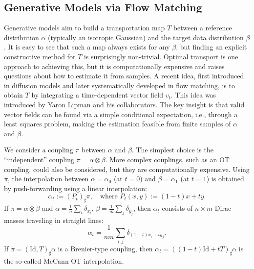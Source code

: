 \subsection{Generative Models via Flow Matching}

Generative models aim to build a transportation map $T$ between a reference distribution $\alpha$ (typically an isotropic Gaussian) and the target data distribution $\beta$. It is easy to see that such a map always exists for any $\beta$, but finding an explicit constructive method for $T$ is surprisingly non-trivial. 
%
Optimal transport is one approach to achieving this, but it is computationally expensive and raises questions about how to estimate it from samples. A recent idea, first introduced in diffusion models and later systematically developed in flow matching, is to obtain $T$ by integrating a time-dependent vector field $v_t$. This idea was introduced by Yaron Lipman and his collaborators. The key insight is that valid vector fields can be found via a simple conditional expectation, i.e., through a least squares problem, making the estimation feasible from finite samples of $\alpha$ and $\beta$.

We consider a coupling $\pi$ between $\alpha$ and $\beta$. The simplest choice is the ``independent'' coupling $\pi = \alpha \otimes \beta$. More complex couplings, such as an OT coupling, could also be considered, but they are computationally expensive. Using $\pi$, the interpolation between $\alpha = \alpha_0$ (at $t=0$) and $\beta = \alpha_1$ (at $t=1$) is obtained by push-forwarding using a linear interpolation:
\begin{equation}
    \alpha_t := (P_t)_\sharp \pi, \quad \text{where } P_t(x, y) := (1-t)x + ty. \label{eq:interp-coupling}
\end{equation}
If $\pi = \alpha \otimes \beta$ and $\alpha = \frac{1}{n} \sum_i \delta_{x_i}$, $\beta = \frac{1}{m} \sum_j \delta_{y_j}$, then $\alpha_t$ consists of $n \times m$ Dirac masses traveling in straight lines:
\begin{equation}
    \alpha_t = \frac{1}{nm} \sum_{i,j} \delta_{(1-t)x_i + ty_j}.
\end{equation}
If $\pi = (\mathrm{Id}, T)_\sharp \alpha$ is a Brenier-type coupling, then $\alpha_t = ((1-t)\mathrm{Id} + tT)_\sharp \alpha$ is the so-called McCann OT interpolation.

